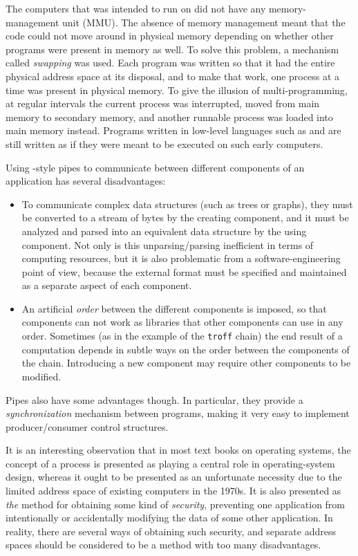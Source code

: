 The computers that \unix{} was intended to run on did not have any
memory-management unit (MMU).  The absence of memory management meant
that the code could not move around in physical memory depending on
whether other programs were present in memory as well.  To solve this
problem, a mechanism called \emph{swapping} was used.  Each program
was written so that it had the entire physical address space at its
disposal, and to make that work, one process at a time was present in
physical memory.  To give the illusion of multi-programming, at
regular intervals the current process was interrupted, moved from main
memory to secondary memory, and another runnable process was loaded
into main memory instead.  Programs written in low-level languages
such as \clanguage{} and \cplusplus{} are still written as if they
were meant to be executed on such early computers.

Using \unix{}-style pipes to communicate between different components of
an application has several disadvantages:

\begin{itemize}
\item To communicate complex data structures (such as trees or
graphs), they must be converted to a stream of bytes by the
creating component, and it must be analyzed and parsed into an
equivalent data structure by the using component.  Not only is
this unparsing/parsing inefficient in terms of computing
resources, but it is also problematic from a
software-engineering point of view, because the external format
must be specified and maintained as a separate aspect of each
component.
\item An artificial \emph{order} between the different components is
imposed, so that components can not work as libraries that other
components can use in any order.  Sometimes (as in the example
of the \texttt{troff} chain) the end result of a computation
depends in subtle ways on the order between the components of
the chain.  Introducing a new component may require other
components to be modified.  
\end{itemize}

Pipes also have some advantages though.  In particular, they provide a
\emph{synchronization} mechanism between programs, making it very easy
to implement producer/consumer control structures.

It is an interesting observation that in most text books on
operating systems, the concept of a process is presented as playing
a central role in operating-system design, whereas it ought to be
presented as an unfortunate necessity due to the limited address
space of existing computers in the 1970s.  It is also presented
as \emph{the} method for obtaining some kind of \emph{security},
preventing one application from intentionally or accidentally
modifying the data of some other application.  In reality, there are
several ways of obtaining such security, and separate address spaces
should be considered to be a method with too many disadvantages. 

